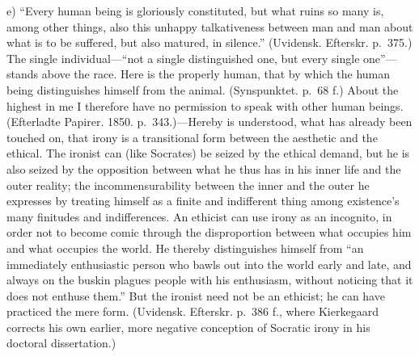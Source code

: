 \documentclass[12pt,a4paper]{book}
\newcommand{\opage}[1]{\marginnote{\footnotesize\textit{[#1]}}}
\begin{document}
e) ``Every human being is gloriously constituted, but what ruins so many
is, among other things, also this unhappy talkativeness between man and
man about what is to be suffered, but also matured, in silence.''
(Uvidensk. Efterskr. p.~375.) The single individual---``not a single
distinguished one, but every single one''---stands above the race. Here is
the properly human, that by which the human being distinguishes himself
from the animal. (Synspunktet. p.~68 f.) About the highest in me I
therefore have no permission to speak with other human beings. (Efterladte
Papirer. 1850. p.~343.)---Hereby is understood, what has already been
touched on, that irony is a transitional form between the aesthetic and
the ethical. The ironist can (like Socrates) be seized by the ethical
demand, but he is also seized by the opposition between what he thus has
in his inner life and the outer reality; the incommensurability between
the inner and the outer he expresses by treating himself as a
\opage{102}finite and indifferent thing among existence's many finitudes
and indifferences. An ethicist can use irony as an incognito, in order not
to become comic through the disproportion between what occupies him and
what occupies the world. He thereby distinguishes himself from ``an
immediately enthusiastic person who bawls out into the world early and
late, and always on the buskin plagues people with his enthusiasm, without
noticing that it does not enthuse them.'' But the ironist need not be an
ethicist; he can have practiced the mere form.
(Uvidensk. Efterskr. p.~386 f., where Kierkegaard corrects his own
earlier, more negative conception of Socratic irony in his doctoral
dissertation.)
\end{document}
